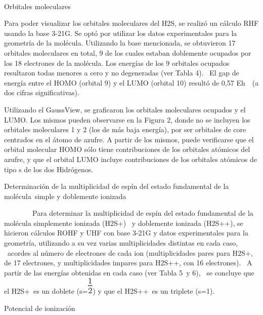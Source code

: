 \documentclass[]{article}
\begin{document}
{~~~~~~~~}

{Orbitales moleculares}

{Para poder visualizar los orbitales moleculares del H}{2}{S, se realizó
un cálculo RHF usando la base 3-21G. Se optó por utilizar los datos
experimentales para la geometría de la molécula. Utilizando la base
mencionada, se obtuvieron 17 orbitales moleculares en total, 9 de los
cuales estaban doblemente ocupados por los 18 electrones de la molécula.
Los energías de los 9 orbitales ocupados resultaron todas menores a cero
y no degeneradas (ver Tabla }{4}{). ~El gap de energía entre el HOMO
(orbital 9) y el LUMO (orbital 10) resultó de 0}{,}{57 E}{h}{~}{~(a dos
cifras significativas). }

{Utilizando el }{GaussView}{, se graficaron los orbitales moleculares
ocupados y el LUMO. Los mismos pueden observarse en la Figura 2, donde
no se incluyen los orbitales moleculares 1 y 2 (los de más baja
energía), por ser orbitales de core centrados en el átomo de azufre. A
partir de los mismos, puede verificarse que el orbital molecular HOMO
sólo tiene contribuciones de los orbitales atómicos del azufre, y que el
orbital LUMO incluye contribuciones de los orbitales atómicos de tipo s
de los dos Hidrógenos.}

{}

{Determinación de la multiplicidad de espín del estado fundamental de la
molécula}{~simple y doblemente ionizada}

{~~~~~~~~Para determinar la multiplicidad de espín del estado
fundamental de la molécula simplemente ionizada (}{H}{2}{S}{+}{) ~y
doblemente ionizada (}{H}{2}{S}{++}{), se hicieron cálculos ROHF y UHF
con base 3-21G y datos experimentales para la geometría, utilizando a su
vez varias multiplicidades distintas en cada caso, ~acordes al número de
electrones de cada ion (multiplicidades pares para }{H}{2}{S}{+}{, de 17
electrones, y multiplicidades impares para }{H}{2}{S}{++}{, con 16
electrones). ~A partir de las energías obtenidas en cada caso (ver Tabla
}{5}{~y }{6}{), ~se concluye que el }{H}{2}{S}{+}{~es un doblete
(s=}\includegraphics{images/image1.png}{) y que el }{H}{2}{S}{++}{~}{es
un triplete (s=1).}

{}

{Potencial de ionización}
\end{document}

